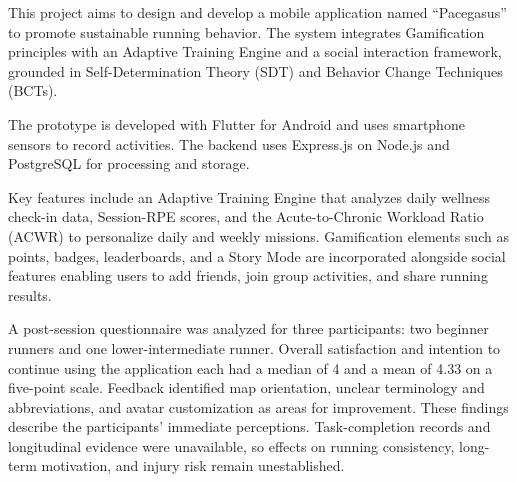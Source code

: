 %
This project aims to design and develop a mobile application named ``Pacegasus'' to promote sustainable running behavior. The system integrates Gamification principles with an Adaptive Training Engine and a social interaction framework, grounded in Self-Determination Theory (SDT) and Behavior Change Techniques (BCTs).

The prototype is developed with Flutter for Android and uses smartphone sensors to record activities. The backend uses Express.js on Node.js and PostgreSQL for processing and storage.

Key features include an Adaptive Training Engine that analyzes daily wellness check-in data, Session-RPE scores, and the Acute-to-Chronic Workload Ratio (ACWR) to personalize daily and weekly missions. Gamification elements such as points, badges, leaderboards, and a Story Mode are incorporated alongside social features enabling users to add friends, join group activities, and share running results.

A post-session questionnaire was analyzed for three participants: two beginner runners and one lower-intermediate runner. Overall satisfaction and intention to continue using the application each had a median of 4 and a mean of 4.33 on a five-point scale. Feedback identified map orientation, unclear terminology and abbreviations, and avatar customization as areas for improvement. These findings describe the participants' immediate perceptions. Task-completion records and longitudinal evidence were unavailable, so effects on running consistency, long-term motivation, and injury risk remain unestablished.
